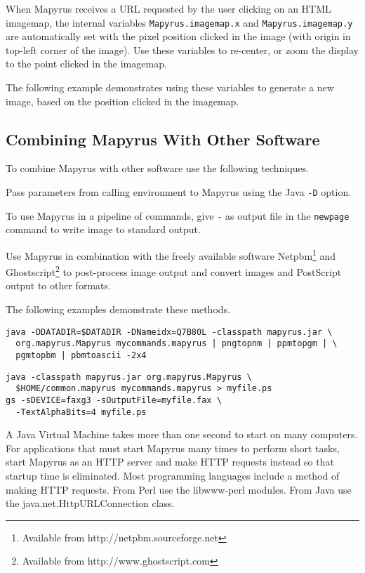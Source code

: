 When Mapyrus receives a URL requested by the user
clicking on an HTML imagemap, the
internal variables
\texttt{Mapyrus.imagemap.x} and
\texttt{Mapyrus.imagemap.y} are automatically set with the pixel position
clicked in the image (with origin in top-left corner of the image).
Use these variables to re-center, or zoom the display to the
point clicked in the imagemap.

The following example demonstrates
using these variables to generate a new image, based on the
position clicked in the imagemap.



\subsection{Combining Mapyrus With Other Software}

To combine Mapyrus with other software use the following
techniques.

Pass parameters from calling environment to Mapyrus using the Java
\texttt{-D} option.

To use Mapyrus in a pipeline of commands,
give \texttt{-} as output file in the
\texttt{newpage}
command to write image to standard output.

Use Mapyrus in combination with the freely available software
Netpbm\footnote{Available from http://netpbm.sourceforge.net} and
Ghostscript\footnote{Available from http://www.ghostscript.com} to post-process
image output and convert images and PostScript output to other formats.

The following examples demonstrate these methods.

\begin{verbatim}
java -DDATADIR=$DATADIR -DNameidx=Q7B80L -classpath mapyrus.jar \
  org.mapyrus.Mapyrus mycommands.mapyrus | pngtopnm | ppmtopgm | \
  pgmtopbm | pbmtoascii -2x4
\end{verbatim}

\begin{verbatim}
java -classpath mapyrus.jar org.mapyrus.Mapyrus \
  $HOME/common.mapyrus mycommands.mapyrus > myfile.ps
gs -sDEVICE=faxg3 -sOutputFile=myfile.fax \
  -TextAlphaBits=4 myfile.ps
\end{verbatim}

A Java Virtual Machine takes more than one second to start on many computers.
For applications that must start Mapyrus many times to perform short tasks,
start Mapyrus as an HTTP server and make HTTP requests instead so that
startup time is eliminated.
Most programming languages include a method of making HTTP requests.
From Perl use the libwww-perl modules.
From Java use the java.net.HttpURLConnection class.

